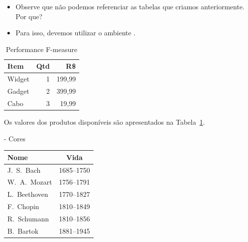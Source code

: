 \documentclass[xcolor=table]{beamer}
\begin{document}
\begin{frame}[fragile]{\insertsubsection}

	\begin{itemize}
		\item Observe que não podemos referenciar as tabelas que criamos anteriormente. Por que?
		\item Para isso, devemos utilizar o ambiente .
	\end{itemize}
	
	\begin{exampletwouptiny}
		\begin{table}[h]\footnotesize
		\caption{Performance F-measure}
			\begin{tabular}{|l|r|r|} 	\hline
				Item   & Qtd & R\$ 		\\ \hline
				Widget & 1   & 199,99  	\\
				Gadget & 2   & 399,99  	\\
				Cabo   & 3   & 19,99   	\\ \hline
			\end{tabular}
			\label{tab:minha-tabela}
		\end{table}
		
		Os valores dos produtos
		dispon\'iveis s\~ao apresentados
		na Tabela~\ref{tab:minha-tabela}.
	\end{exampletwouptiny}	
\end{frame}

\begin{frame}[fragile]{\insertsubsection{} - Cores}

	\begin{exampletwouptiny}
	    \rowcolors{1}{yellow}{green} 
	    \begin{tabular}{|l|c|}\hline
	    Nome & Vida \\ \hline
	    J.\ S.\ Bach
	    & 1685--1750 \\
	    W.\ A.\ Mozart & 1756--1791 \\
	    L.\ Beethoven & 1770--1827 \\
	    F.\ Chopin
	    & 1810--1849 \\
	    R.\ Schumann
	    & 1810--1856 \\
	    B.\ Bartok & 1881--1945 \\ \hline
	    \end{tabular}
	\end{exampletwouptiny}

\end{frame}
\end{document}
